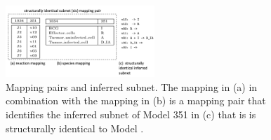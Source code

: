 \documentclass[webpdf,contemporary,large]{oup-authoring-template}
\newcommand{\revision}[1]{\color{red}{#1 }\color{black}}
\newcommand{\revisionb}[1]{\color{red}{#1}\color{black}}
\theoremstyle{thmstyleone}%
\theoremstyle{thmstyletwo}%
\theoremstyle{thmstylethree}%
\begin{document}
\begin{figure}
%
%
\includegraphics[width=0.5\textwidth, angle=0]{figures/example-mapping.png}
\caption{Mapping pairs and inferred subnet. The \revision{reation} mapping in (a) in combination with the \revision{species} mapping in (b) is a mapping pair that identifies the inferred subnet of Model 351 in (c) that is is structurally identical to Model \revisionb{1034}.}
\label{fig:running-example-induced-network}
\end{figure}
\end{document}

